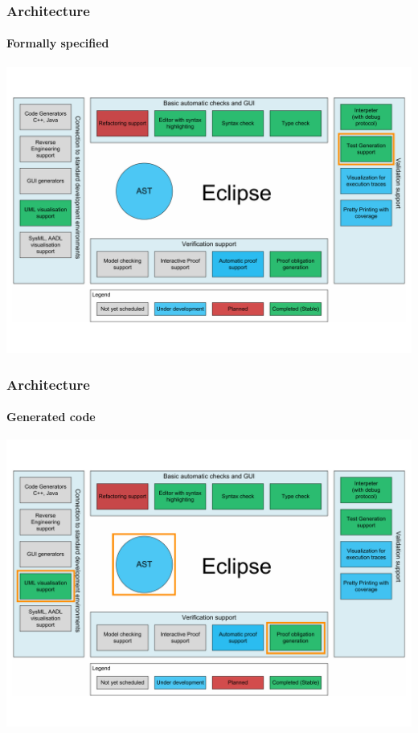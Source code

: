 \documentclass[slidestop,uncompress,mathserif,notes]{beamer}
\begin{document}
\begin{frame}[c]
  \frametitle{Architecture}
  \framesubtitle{Formally specified}

  \begin{center}
    \includegraphics[width=\textwidth]{images/overture_arch_spec.pdf}
  \end{center}
\end{frame}

\begin{frame}[c]
  \frametitle{Architecture}
  \framesubtitle{Generated code}

  \begin{center}
    \includegraphics[width=\textwidth]{images/overture_arch_cg.pdf}
  \end{center}
\end{frame}
\end{document}
